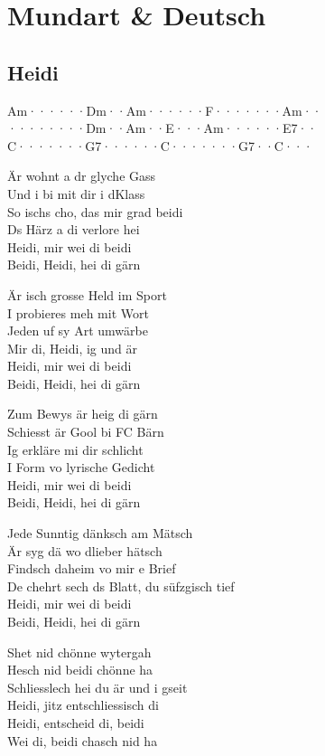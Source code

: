 \documentclass[
  letterpaper,
  twoside=false]{scrbook}
\begin{document}
\part{Mundart \& Deutsch}

\hypertarget{heidi}{%
\chapter{Heidi}\label{heidi}}

\textbar Am······\textbar Dm··Am··\textbar····F···\textbar····Am··\textbar{}\\
\textbar········\textbar Dm··Am··\textbar E···Am··\textbar····E7··\textbar{}\\
\textbar C·······\textbar G7······\textbar C·······\textbar G7··C···\textbar{}

Är wohnt a dr glyche Gass\\
Und i bi mit dir i d\textquotesingle Klass\\
So ischs cho, das mir grad beidi\\
Ds Härz a di verlore hei\\
Heidi, mir wei di beidi\\
Beidi, Heidi, hei di gärn

Är isch grosse Held im Sport\\
I probieres meh mit Wort\\
Jeden uf sy Art umwärbe\\
Mir di, Heidi, ig und är\\
Heidi, mir wei di beidi\\
Beidi, Heidi, hei di gärn

Zum Bewys är heig di gärn\\
Schiesst är Gool bi FC Bärn\\
Ig erkläre mi dir schlicht\\
I Form vo lyrische Gedicht\\
Heidi, mir wei di beidi\\
Beidi, Heidi, hei di gärn

Jede Sunntig dänksch am Mätsch\\
Är syg dä wo d\textquotesingle lieber hätsch\\
Findsch daheim vo mir e Brief\\
De chehrt sech ds Blatt, du süfzgisch tief\\
Heidi, mir wei di beidi\\
Beidi, Heidi, hei di gärn

S\textquotesingle het nid chönne wytergah\\
Hesch nid beidi chönne ha\\
Schliesslech hei du är und i gseit\\
Heidi, jitz entschliessisch di\\
Heidi, entscheid di, beidi\\
Wei di, beidi chasch nid ha
\end{document}

